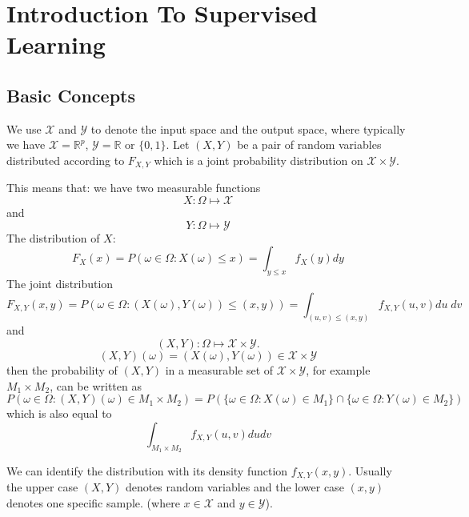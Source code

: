 \section{Introduction To Supervised Learning}
\subsection{Basic Concepts}
We use $\mathcal{X}$ and $\mathcal{Y}$ to denote the input space and the output space, where typically we have $\mathcal{X}=\mathbb{R}^p$, $\mathcal{Y}=\mathbb{R}$ or $\{0,1\}$. Let $(X,Y)$ be a pair of random variables distributed according to $F_{X,Y}$ which is a joint probability distribution on $\mathcal{X}\times\mathcal{Y}$.   

This means that: we have two measurable functions
\begin{equation}
\label{eq:3}
X: \Omega\mapsto \mathcal X  
\end{equation}
and
\begin{equation}
\label{eq:4}
Y: \Omega\mapsto \mathcal Y  
\end{equation}
The distribution of $X$:
\begin{equation}
\label{eq:1}
F_X(x)=P(\omega\in\Omega: X(\omega)\le x) =\int_{y\le x}f_X(y) dy  
\end{equation}
The joint distribution 
\begin{equation}
\label{eq:2}
F_{X,Y}(x,y)=P(\omega\in\Omega: (X(\omega),Y(\omega))\le (x,y)) 
=\int_{(u,v)\le (x,y)}f_{X,Y}(u,v) du\;dv
\end{equation}
and 
\begin{equation}
(X,Y): \Omega\mapsto \mathcal X\times \mathcal Y.
\end{equation}
\begin{equation}
(X,Y)(\omega) = (X(\omega), Y(\omega)) \in \mathcal{X}\times\mathcal{Y}
\end{equation}
then the probability of $(X,Y)$ in a measurable set of $\mathcal{X}\times\mathcal{Y}$, for example $M_1\times M_2$, can be written as
\begin{equation}
P(\omega\in\Omega: (X,Y)(\omega) \in M_1\times M_2)= P\left( \{\omega\in\Omega: X(\omega)\in M_1\} \cap \{\omega\in\Omega: Y(\omega)\in M_2\} \right)
\end{equation}
which is also equal to
\begin{equation}
\int_{M_1\times M_2} f_{X,Y}(u,v)dudv
\end{equation}

We can identify the distribution with its density function $f_{X,Y}(x,y)$. Usually the upper case $(X,Y)$ denotes random variables and the lower case $(x,y)$ denotes one specific sample. (where $x \in \mathcal{X}$ and $y \in \mathcal{Y}$).

